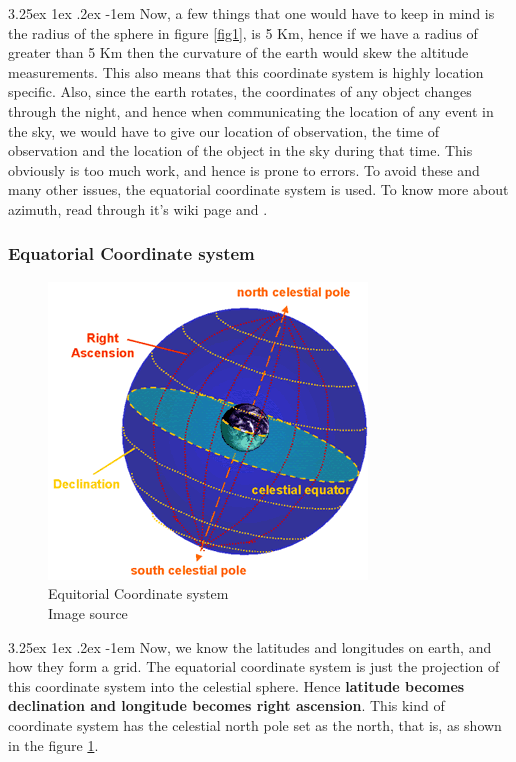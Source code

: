 \documentclass[a4paper,twoside,11pt]{article}
\makeatletter
\numberwithin{equation}{section}
\renewcommand\paragraph{\@startsection{paragraph}{5}{\z@}%
  {3.25ex \@plus1ex \@minus.2ex}%
  {-1em}%
  {\normalfont\normalsize\bfseries}}
\makeatother
\begin{document}
\paragraph{}
Now, a few things that one would have to keep in mind is the radius of the sphere in figure \ref{fig1}, is 5 Km, hence if we have a radius of greater than 5 Km then the curvature of the earth would skew the altitude measurements. This also means that this coordinate system is highly location specific. Also, since the earth rotates, the coordinates of any object changes through the night, and hence when communicating the location of any event in the sky, we would have to give our location of observation, the time of observation and the location of the object in the sky during that time. This obviously is too much work, and hence is prone to errors. To avoid these and many other issues, the equatorial coordinate system is used. To know more about azimuth, read through it's wiki page \cite{azimuth_wiki} and \cite{coord_wiki}.
\subsubsection{Equatorial Coordinate system}
\begin{figure}
\includegraphics[width=0.9\linewidth]{fig2.png} 
\caption{Equitorial Coordinate system \\ Image source \cite{equi_coord1}}
\label{fig2}
\end{figure}
\paragraph{}
Now, we know the latitudes and longitudes on earth, and how they form a grid. The equatorial coordinate system is just the projection of this coordinate system into the celestial sphere. Hence \textbf{latitude becomes declination and longitude becomes right ascension}. This kind of coordinate system has the celestial north pole set as the north, that is, as shown in the figure \ref{fig2}. 
\end{document}

